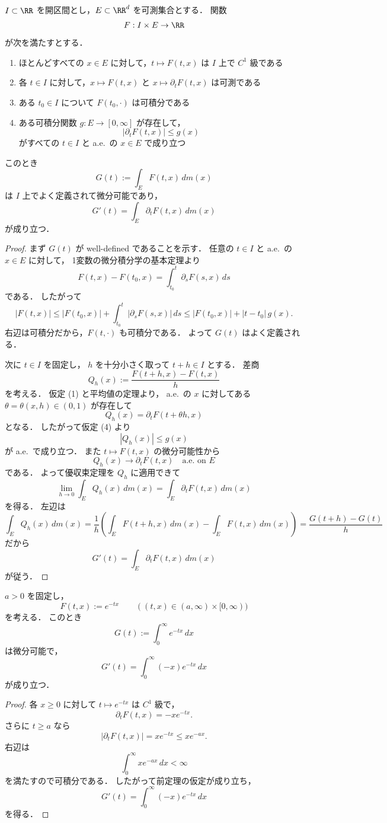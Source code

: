 \begin{theorem}[積分記号下の微分]
$I \subset \RR$ を開区間とし，$E \subset \RR^d$ を可測集合とする．
関数
\[
F:I \times E \to \RR
\]
が次を満たすとする．
\begin{enumerate}
    \item ほとんどすべての $x \in E$ に対して，$t \mapsto F(t,x)$ は $I$ 上で $C^1$ 級である
    \item 各 $t \in I$ に対して，$x \mapsto F(t,x)$ と $x \mapsto \partial_tF(t,x)$ は可測である
    \item ある $t_0 \in I$ について $F(t_0,\cdot)$ は可積分である
    \item ある可積分関数 $g:E \to [0,\infty]$ が存在して，
    \[
    |\partial_tF(t,x)|\le g(x)
    \]
    がすべての $t \in I$ と a.e.\ の $x \in E$ で成り立つ
\end{enumerate}
このとき
\[
G(t):=\int_E F(t,x)\,dm(x)
\]
は $I$ 上でよく定義されて微分可能であり，
\[
G'(t)=\int_E \partial_tF(t,x)\,dm(x)
\]
が成り立つ．
\end{theorem}
\begin{proof}
まず $G(t)$ が well-defined であることを示す．
任意の $t \in I$ と a.e.\ の $x \in E$ に対して，
1変数の微分積分学の基本定理より
\[
F(t,x)-F(t_0,x)=\int_{t_0}^t \partial_sF(s,x)\,ds
\]
である．
したがって
\[
|F(t,x)|
\le
|F(t_0,x)|+\int_{t_0}^t |\partial_sF(s,x)|\,ds
\le
|F(t_0,x)|+|t-t_0|\,g(x).
\]
右辺は可積分だから，$F(t,\cdot)$ も可積分である．
よって $G(t)$ はよく定義される．

次に $t \in I$ を固定し，
$h$ を十分小さく取って $t+h \in I$ とする．
差商
\[
Q_h(x):=\frac{F(t+h,x)-F(t,x)}{h}
\]
を考える．
仮定 (1) と平均値の定理より，
a.e.\ の $x$ に対してある $\theta=\theta(x,h)\in(0,1)$ が存在して
\[
Q_h(x)=\partial_tF(t+\theta h,x)
\]
となる．
したがって仮定 (4) より
\[
|Q_h(x)|\le g(x)
\]
が a.e.\ で成り立つ．
また $t \mapsto F(t,x)$ の微分可能性から
\[
Q_h(x)\to \partial_tF(t,x)
\quad
\text{a.e.\ on } E
\]
である．
よって優収束定理を $Q_h$ に適用できて
\[
\lim_{h\to 0}\int_E Q_h(x)\,dm(x)
=
\int_E \partial_tF(t,x)\,dm(x)
\]
を得る．
左辺は
\[
\int_E Q_h(x)\,dm(x)
=
\frac{1}{h}
\left(
\int_E F(t+h,x)\,dm(x)-\int_E F(t,x)\,dm(x)
\right)
=
\frac{G(t+h)-G(t)}{h}
\]
だから
\[
G'(t)=\int_E \partial_tF(t,x)\,dm(x)
\]
が従う．
\end{proof}

\begin{example}
$a>0$ を固定し，
\[
F(t,x):=e^{-tx}
\qquad
((t,x)\in (a,\infty)\times[0,\infty))
\]
を考える．
このとき
\[
G(t):=\int_0^{\infty}e^{-tx}\,dx
\]
は微分可能で，
\[
G'(t)=\int_0^{\infty}(-x)e^{-tx}\,dx
\]
が成り立つ．
\end{example}
\begin{proof}
各 $x\ge 0$ に対して $t\mapsto e^{-tx}$ は $C^1$ 級で，
\[
\partial_tF(t,x)=-xe^{-tx}.
\]
さらに $t\ge a$ なら
\[
|\partial_tF(t,x)|
=
xe^{-tx}
\le
xe^{-ax}
.
\]
右辺は
\[
\int_0^{\infty}xe^{-ax}\,dx<\infty
\]
を満たすので可積分である．
したがって前定理の仮定が成り立ち，
\[
G'(t)=\int_0^{\infty}(-x)e^{-tx}\,dx
\]
を得る．
\end{proof}


